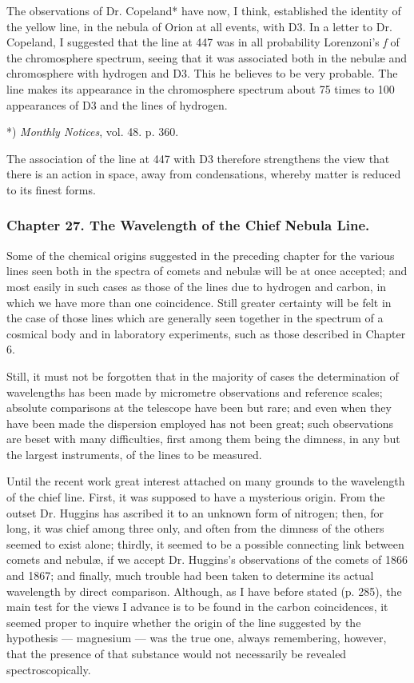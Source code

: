 \documentclass[a4paper, 12pt, oneside, polutonikogreek, english]{article}
\begin{document}
The observations of Dr. Copeland* have now, I think, established the identity of the yellow line, in the nebula of Orion at all events, with D3. In a letter to Dr. Copeland, I suggested that the line at 447 was in all probability Lorenzoni's \emph{f} of the chromosphere spectrum, seeing that it was associated both in the nebulæ and chromosphere with hydrogen and D3. This he believes to be very probable. The line makes its appearance in the chromosphere spectrum about 75 times to 100 appearances of D3 and the lines of hydrogen.

*) \emph{Monthly Notices}, vol. 48. p. 360.

The association of the line at 447 with D3 therefore strengthens the view that there is an action in space, away from condensations, whereby matter is reduced to its finest forms.

\subsubsection{Chapter 27. The Wavelength of the Chief Nebula Line.}

Some of the chemical origins suggested in the preceding chapter for the various lines seen both in the spectra of comets and nebulæ will be at once accepted; and most easily in such cases as those of the lines due to hydrogen and carbon, in which we have more than one coincidence. Still greater certainty will be felt in the case of those lines which are generally seen together in the spectrum of a cosmical body and in laboratory experiments, such as those described in Chapter 6.

Still, it must not be forgotten that in the majority of cases the determination of wavelengths has been made by micrometre observations and reference scales; absolute comparisons at the telescope have been but rare; and even when they have been made the dispersion employed has not been great; such observations are beset with many difficulties, first among them being the dimness, in any but the largest instruments, of the lines to be measured.

Until the recent work great interest attached on many grounds to the wavelength of the chief line. First, it was supposed to have a mysterious origin. From the outset Dr. Huggins has ascribed it to an unknown form of nitrogen; then, for long, it was chief among three only, and often from the dimness of the others seemed to exist alone; thirdly, it seemed to be a possible connecting link between comets and nebulæ, if we accept Dr. Huggins's observations of the comets of 1866 and 1867; and finally, much trouble had been taken to determine its actual wavelength by direct comparison. Although, as I have before stated (p. 285), the main test for the views I advance is to be found in the carbon coincidences, it seemed proper to inquire whether the origin of the line suggested by the hypothesis --- magnesium --- was the true one, always remembering, however, that the presence of that substance would not necessarily be revealed spectroscopically.
\end{document}
